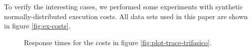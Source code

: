 \documentclass[times, 10pt,twocolumn]{article}
\begin{document}
\label{sec:indiv-simul-results}

To verify the interesting cases, we performed some experiments with
synthetic normally-distributed execution costs. All data sets used in
this paper are shown in figure \ref{fig:ex-costs}.

\begin{figure}[t]
  \centering
  \caption{Response times for the costs in figure
    \ref{fig:plot-trace-trifasico}.}
  \label{fig:trifasico}
\end{figure}
\end{document}

